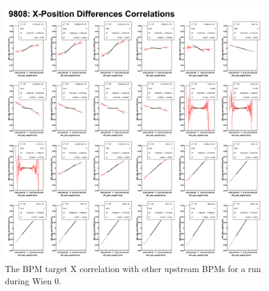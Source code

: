 \begin{singlespace}
\begin{figure}[!h]
	\begin{center}
	\includegraphics[width=15.0cm]{figures/XtgtCorrelation9808}
	\end{center}
	\caption
	{The BPM target X correlation with other upstream BPMs for a run during Wien 0.}
	\label{fig:XtgtCorrelation9808}
\end{figure}
\end{singlespace}

